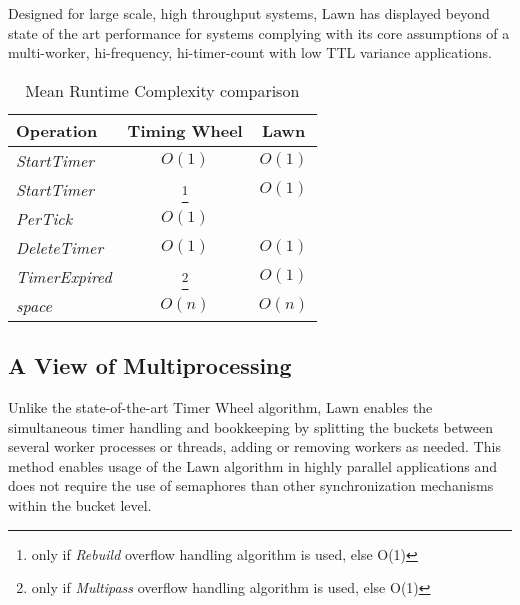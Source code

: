 \documentclass[conference]{IEEEtran}
\begin{document}
Designed for large scale, high throughput systems, Lawn has displayed beyond state of the art performance for systems complying with its core assumptions of a multi-worker, hi-frequency, hi-timer-count with low TTL variance applications.

\begin{table}[ht]
	\begin{center}
		\begin{tabular}{l|c|c}
			\textbf{Operation} & \textbf{Timing Wheel} & \textbf{Lawn} \\
			\hline
			\textit{StartTimer} & $O(1)$ & $O(1)$ \\
			\textit{StartTimer} & \boldmath{$O(n)$}\footnote{only if \textit{Rebuild} overflow handling algorithm is used, else O(1)} & $O(1)$ \\
			\textit{PerTick} & $O(1)$ & \boldmath{$O(t\sim1)$} \\
			\textit{DeleteTimer} & $O(1)$ & $O(1)$ \\
			\textit{TimerExpired} & \boldmath{$O(n)$}\footnote{only if \textit{Multipass} overflow handling algorithm is used, else O(1)} & $O(1)$ \\
			\textit{space} & $O(n)$ & $O(n)$ \\
		\end{tabular}
		\linebreak
		\caption{Mean Runtime Complexity comparison}
	\end{center}
\end{table}

\subsection{A View of Multiprocessing}
Unlike the state-of-the-art Timer Wheel algorithm, Lawn enables the simultaneous timer handling and bookkeeping by splitting the buckets between several worker processes or threads, adding or removing workers as needed. This method enables usage of the Lawn algorithm in highly parallel applications and does not require the use of semaphores than other synchronization mechanisms within the bucket level.
\end{document}
